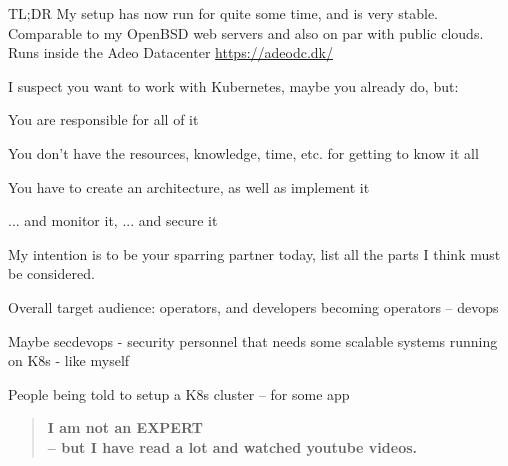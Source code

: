 \documentclass[Screen16to9,17pt]{foils}
\begin{document}
TL;DR My setup has now run for quite some time, and is very stable. Comparable to my OpenBSD web servers and also on par with public clouds.
Runs inside the Adeo Datacenter \url{https://adeodc.dk/}



I suspect you want to work with Kubernetes, maybe you already do, but:
\begin{list2}
\item You are responsible for all of it
\item You don't have the resources, knowledge, time, etc. for getting to know it all
\item You have to create an architecture, as well as implement it
\item ... and monitor it, ... and secure it
\end{list2}
My intention is to be your sparring partner today, list all the parts I think must be considered.



\begin{quote}

\end{quote}

\begin{list2}
\item Overall target audience: operators, and developers becoming operators -- devops
\item Maybe secdevops - security personnel that needs some scalable systems running on K8s
    - like myself
\item People being told to setup a K8s cluster -- for some app
\end{list2}



\begin{quote}
\large \bf I am not an EXPERT \\
-- but I have read a lot and watched youtube videos. \smiley
\end{quote}
\end{document}
